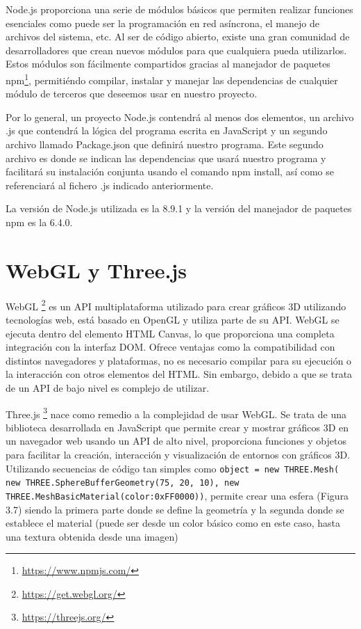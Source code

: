 Node.js proporciona una serie de módulos básicos que permiten realizar funciones esenciales como puede ser la programación en red asíncrona, el manejo de archivos del sistema, etc. Al ser de código abierto, existe una gran comunidad de desarrolladores que crean nuevos módulos para que cualquiera pueda utilizarlos. Estos módulos son fácilmente compartidos gracias al manejador de paquetes npm\footnote{\url{https://www.npmjs.com/}}, permitiéndo compilar, instalar y manejar las dependencias de cualquier módulo de terceros que deseemos usar en nuestro proyecto.
 
Por lo general, un proyecto Node.js contendrá al menos dos elementos, un archivo .js que contendrá la lógica del programa escrita en JavaScript y un segundo archivo llamado Package.json que definirá nuestro programa. Este segundo archivo es donde se indican las dependencias que usará nuestro programa y facilitará su instalación conjunta usando el comando npm install, así como se referenciará al fichero .js indicado anteriormente.

La versión de Node.js utilizada es la 8.9.1 y la versión del manejador de paquetes npm es la 6.4.0.

\section{WebGL y Three.js}
WebGL \footnote{\url{https://get.webgl.org/}}  es un API multiplataforma utilizado para crear gráficos 3D utilizando tecnologías web, está basado en OpenGL y utiliza parte de su API. WebGL se ejecuta dentro del elemento HTML Canvas, lo que proporciona una completa integración con la interfaz DOM. Ofrece ventajas como la compatibilidad con distintos navegadores y plataformas, no es necesario compilar para su ejecución o la interacción con otros elementos del HTML. Sin embargo, debido a que se trata de un API de bajo nivel es complejo de utilizar.

Three.js \footnote{\url{https://threejs.org/}} nace como remedio a la complejidad de usar WebGL. Se trata de una biblioteca desarrollada en JavaScript que permite crear y mostrar gráficos 3D en un navegador web usando un API de alto nivel, proporciona funciones y objetos para facilitar la creación, interacción y visualización de entornos con gráficos 3D. Utilizando secuencias de código tan simples como \texttt{object = new THREE.Mesh( new THREE.SphereBufferGeometry(75, 20, 10), new THREE.MeshBasicMaterial({color:0xFF0000}))}, permite crear una esfera (Figura 3.7) siendo la primera parte donde se define la geometría y la segunda donde se establece el material (puede ser desde un color básico como en este caso, hasta una textura obtenida desde una imagen)

